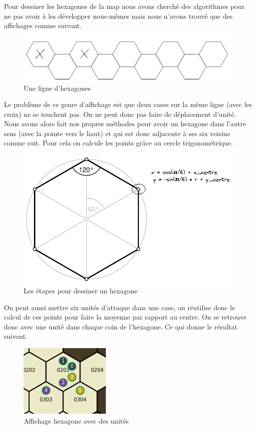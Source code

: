 Pour dessiner les hexagones de la map nous avons cherché des algorithmes pour ne pas avoir à les développer nous-mêmes mais nous n'avons trouvé que des affichages comme suivant.

\begin{figure}[H]
    \centering
    \includegraphics[scale=0.3]{data/hexmap_exemple.png}
    \caption{Une ligne d'hexagones}
\end{figure}

 Le problème de ce genre d'affichage est que deux cases sur la même ligne (avec les croix) ne se touchent pas. On ne peut donc pas faire de déplacement d'unité. Nous avons alors fait nos propres méthodes pour avoir un hexagone dans l'autre sens (avec la pointe vers le haut) et qui est donc adjacente à ses six voisins comme suit. Pour cela on calcule les points grâce au cercle trigonométrique.
 
\begin{figure}[H]
    \centering
    \includegraphics[scale=0.3]{data/hexagon.png}
    \caption{Les étapes pour dessiner un hexagone}
\end{figure}

 On peut aussi mettre six unités d'attaque dans une case, on réutilise donc le calcul de ces points pour faire la moyenne par rapport au centre. On se retrouve donc avec une unité dans chaque coin de l'hexagone. Ce qui donne le résultat suivant.
 
\begin{figure}[H]
    \centering
    \includegraphics[scale=.7]{data/hexagon_with_units.png}
    \caption{Affichage hexagone avec des unités}
\end{figure}

